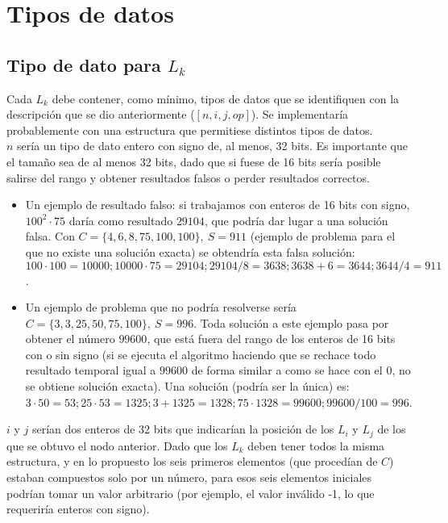 \section{Tipos de datos}
\subsection{Tipo de dato para $L_k$}

Cada $L_k$ debe contener, como mínimo, tipos de datos que se identifiquen con la
 descripción que se dio anteriormente ($[n, i, j, op]$). Se implementaría
 probablemente con una estructura que permitiese distintos tipos de datos.\\

$n$ sería un tipo de dato entero con signo de, al menos, 32 bits. Es importante
que el tamaño sea de al menos 32 bits, dado que si fuese de 16 bits sería posible
 salirse del rango y obtener resultados falsos o perder resultados correctos.
\begin{itemize}
	\item Un ejemplo de resultado falso: si trabajamos con enteros de 16 bits con
	signo, $100^2 \cdot 75$ daría como resultado $29104$, que podría dar lugar a
	una solución falsa. Con $C=\{4, 6, 8, 75, 100, 100\},\ S = 911$ (ejemplo de
	problema para el que no existe una solución exacta) se obtendría esta falsa
	solución: $100 \cdot 100=10000; 10000 \cdot 75=29104;29104/8=3638;3638+6=3644;3644/4=911$.
	\item Un ejemplo de problema que no podría resolverse sería
	$C=\{3, 3, 25, 50, 75, 100\},\ S = 996$. Toda solución a este ejemplo pasa por
	obtener el número $99600$, que está fuera del rango de los enteros de 16 bits
	con o sin signo (si se ejecuta el algoritmo haciendo que se rechace todo
	resultado temporal igual a $99600$ de forma similar a como se hace con el
	$0$, no se obtiene solución exacta). Una solución (podría ser la única) es:
	$3 \cdot 50 = 53; 25 \cdot 53 = 1325; 3+1325=1328; 75 \cdot 1328 = 99600; 99600/100=996$.
\end{itemize}

$i$ y $j$ serían dos enteros de 32 bits que indicarían la posición de los $L_i$
y $L_j$ de los que se obtuvo el nodo anterior. Dado que los $L_k$ deben tener
todos la misma estructura, y en lo propuesto los seis primeros elementos (que
procedían de $C$) estaban compuestos solo por un número, para esos seis
elementos iniciales podrían tomar un valor arbitrario (por ejemplo, el valor
inválido -1, lo que requeriría enteros con signo). \\

